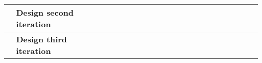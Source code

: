 \begin{table}[ht!]
\begin{tabular}{lp{2.5in}|llllllllllllllllllll|}
    \multicolumn{1}{|l|}{\cellcolor[HTML]{00E2FF}\textbf{}}                & \cellcolor[HTML]{00E2FF}\textbf{Design second iteration}                   & \multicolumn{1}{l|}{}                                   & \multicolumn{1}{l|}{}                                   & \multicolumn{1}{l|}{}                                   & \multicolumn{1}{l|}{}                                   & \multicolumn{1}{l|}{}                                   & \multicolumn{1}{l|}{}                                   & \multicolumn{1}{l|}{}                                   & \multicolumn{1}{l|}{}                                   & \multicolumn{1}{l|}{}                                   & \multicolumn{1}{l|}{\cellcolor[HTML]{F8A102}}            & \multicolumn{1}{l|}{\cellcolor[HTML]{F8A102}}            & \multicolumn{1}{l|}{\cellcolor[HTML]{F8A102}}            & \multicolumn{1}{l|}{}                                    & \multicolumn{1}{l|}{}                                    & \multicolumn{1}{l|}{}                                    & \multicolumn{1}{l|}{}                                    & \multicolumn{1}{l|}{}                                    & \multicolumn{1}{l|}{}                                    & \multicolumn{1}{l|}{}                                    &             \\ \hline
    \multicolumn{1}{|l|}{\cellcolor[HTML]{00E2FF}\textbf{}}                & \cellcolor[HTML]{00E2FF}\textbf{Design third iteration}                    & \multicolumn{1}{l|}{}                                   & \multicolumn{1}{l|}{}                                   & \multicolumn{1}{l|}{}                                   & \multicolumn{1}{l|}{}                                   & \multicolumn{1}{l|}{}                                   & \multicolumn{1}{l|}{}                                   & \multicolumn{1}{l|}{}                                   & \multicolumn{1}{l|}{}                                   & \multicolumn{1}{l|}{}                                   & \multicolumn{1}{l|}{}                                    & \multicolumn{1}{l|}{}                                    & \multicolumn{1}{l|}{}                                    & \multicolumn{1}{l|}{\cellcolor[HTML]{F8A102}}            & \multicolumn{1}{l|}{}                                    & \multicolumn{1}{l|}{}                                    & \multicolumn{1}{l|}{}                                    & \multicolumn{1}{l|}{}                                    & \multicolumn{1}{l|}{}                                    & \multicolumn{1}{l|}{}                                    &             \\ \hline

\end{tabular}
\end{table}
